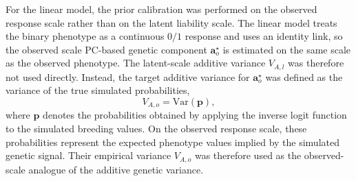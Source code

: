 


For the linear model, the prior calibration was performed on the observed response scale rather than on the latent liability scale. The linear model treats the binary phenotype as a continuous $0/1$ response and uses an identity link, so the observed scale PC-based genetic component $\mathbf{a}^\star_o$ is estimated on the same scale as the observed phenotype. The latent-scale additive variance $V_{A,l}$ was therefore not used directly. Instead, the target additive variance for $\mathbf{a}^\star_o$ was defined as the variance of the true simulated probabilities,
\[
V_{A,o} = \mathrm{Var}(\mathbf{p}),
\]
where $\mathbf{p}$ denotes the probabilities obtained by applying the inverse logit function to the simulated breeding values.
On the observed response scale, these probabilities represent the expected phenotype values implied by the simulated genetic signal. Their empirical variance $V_{A,o}$ was therefore used as the observed-scale analogue of the additive genetic variance.

